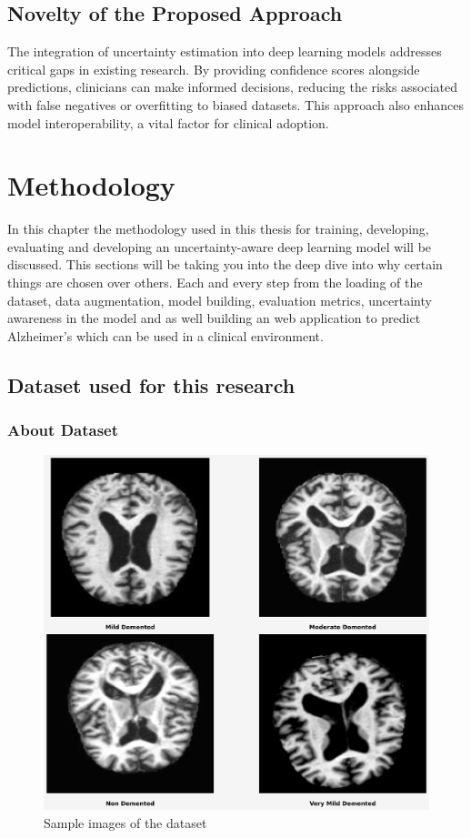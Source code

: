 \documentclass[12pt,onecolumn]{report}
\begin{document}
\section{Novelty of the Proposed Approach}
The integration of uncertainty estimation into deep learning models addresses critical gaps in existing research. By providing confidence scores alongside predictions, clinicians can make informed decisions, reducing the risks associated with false negatives or overfitting to biased datasets. This approach also enhances model interoperability, a vital factor for clinical adoption.

\chapter{Methodology}

In this chapter the methodology used in this thesis for training, developing, evaluating and developing an uncertainty-aware deep learning model will be discussed. This sections will be taking you into the deep dive into why certain things are chosen over others. Each and every step from the loading of the dataset, data augmentation, model building, evaluation metrics, uncertainty awareness in the model and as well building an web application to predict Alzheimer's which can be used in a clinical environment.

\section{Dataset used for this research}

\subsection{About Dataset}

\begin{figure}[h!]
    \centering
    \includegraphics[width=0.8\columnwidth]{figures/dataset.png}  %
    \caption{Sample images of the dataset} %
    \label{fig:dataset} %
\end{figure}
\end{document}
